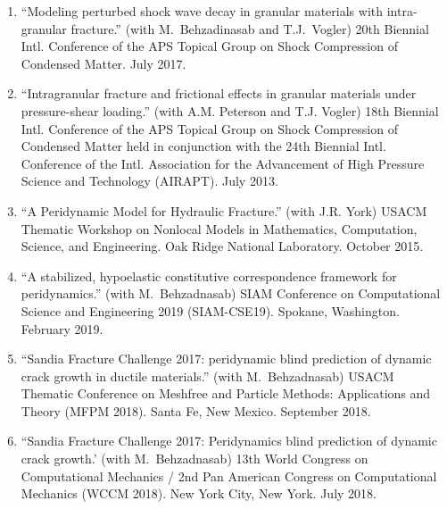 \ifdefined\iscockrell
\begin{enumerate}
  \item ``Modeling perturbed shock wave decay in granular materials with intra-granular fracture.'' (with M.\ Behzadinasab and T.J.\ Vogler) 20th Biennial Intl. Conference of the APS Topical Group on Shock Compression of Condensed Matter. July 2017.
  \item ``Intragranular fracture and frictional effects in granular materials under pressure-shear loading.'' (with A.M. Peterson and T.J. Vogler) 18th Biennial Intl. Conference of the APS Topical Group on Shock Compression of Condensed Matter held in conjunction with the 24th Biennial Intl. Conference of the Intl. Association for the Advancement of High Pressure Science and Technology (AIRAPT). July 2013.
  \item ``A Peridynamic Model for Hydraulic Fracture.'' (with J.R. York) USACM Thematic Workshop on Nonlocal Models in Mathematics, Computation, Science, and Engineering.  Oak Ridge National Laboratory. October 2015.
  \item ``A stabilized, hypoelastic constitutive correspondence framework for peridynamics.'' (with M.\ Behzadnasab) SIAM Conference on Computational Science and Engineering 2019 (SIAM-CSE19). Spokane, Washington. February 2019.
  \item ``Sandia Fracture Challenge 2017: peridynamic blind prediction of dynamic crack growth in ductile materials.'' (with M.\ Behzadnasab) USACM Thematic Conference on Meshfree and Particle Methods: Applications and Theory (MFPM 2018). Santa Fe, New Mexico. September 2018.
  \item ``Sandia Fracture Challenge 2017: Peridynamics blind prediction of dynamic crack growth.' (with M.\ Behzadnasab) 13th World Congress on Computational Mechanics / 2nd Pan American Congress on Computational Mechanics (WCCM 2018). New York City, New York. July 2018.
\end{enumerate}
\else
\ifdefined\ispdf
